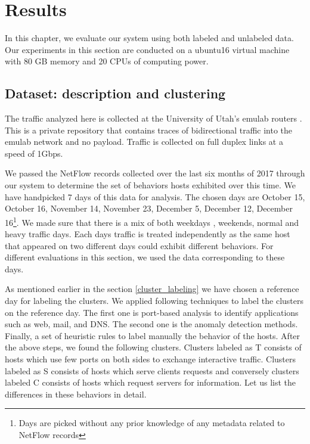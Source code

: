 
\chapter{Results}

In this chapter, we evaluate our system using both labeled and unlabeled data. Our experiments in this section are conducted on a ubuntu16 virtual machine with 80 GB memory and 20 CPUs of computing power. 

\section{Dataset: description and clustering}
The traffic analyzed here is collected at the University of Utah's emulab routers \cite{White+:osdi02}. This is a private repository that contains traces of bidirectional traffic into the emulab network and no payload. Traffic is collected on full duplex links at a speed of 1Gbps.

We passed the NetFlow records collected over the last six months of 2017 through our system to determine the set of behaviors hosts exhibited over this time. We have handpicked 7 days of this data for analysis. The chosen days are October 15, October 16, November 14, November 23, December 5, December 12, December 16\footnote{Days are picked without any prior knowledge of any metadata related to NetFlow records}. We made sure that there is a mix of both weekdays , weekends, normal and heavy traffic days. Each days traffic is treated independently as the same host that appeared on two different days could exhibit different behaviors. For different evaluations in this section, we used the data corresponding to these days.

As mentioned earlier in the section \ref{cluster_labeling} we have chosen a reference day for labeling the clusters. We applied following techniques to label the clusters on the reference day. The first one is port-based analysis to identify applications such as web, mail, and DNS. The second one is the anomaly detection methods. Finally, a set of heuristic rules to label manually the behavior of the hosts. After the above steps, we found the following clusters. Clusters labeled as T consists of hosts which use few ports on both sides to exchange interactive traffic. Clusters labeled as S consists of hosts which serve clients requests and conversely clusters labeled C consists of hosts which request servers for information. Let us list the differences in these behaviors in detail.

